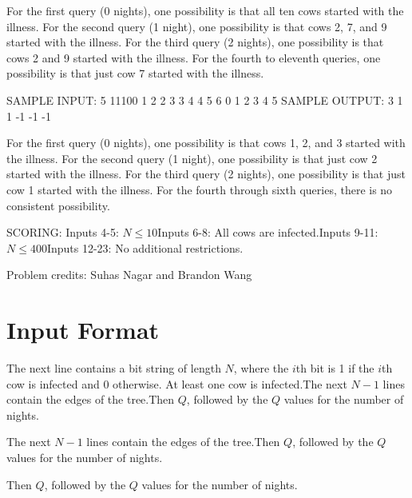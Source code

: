 \documentclass[12pt]{article}
\begin{document}
For the first query (0 nights), one possibility is that all ten cows started
with the illness. For the second query (1 night), one possibility is that cows
2, 7, and 9 started with the illness. For the third query (2 nights), one
possibility is that cows 2 and 9 started with the illness. For the fourth to
eleventh queries, one possibility is that just cow 7 started with the illness.

SAMPLE INPUT:
5
11100
1 2
2 3
3 4
4 5
6
0
1
2
3
4
5
SAMPLE OUTPUT: 
3
1
1
-1
-1
-1

For the first query (0 nights), one possibility is that cows 1, 2, and 3 started
with the illness. For the second query (1 night), one possibility is that just
cow 2 started with the illness. For the third query (2 nights), one possibility
is that just cow 1 started with the illness. For the fourth through sixth
queries, there is no consistent possibility.

SCORING:
Inputs 4-5: $N \le 10$Inputs 6-8: All cows are infected.Inputs 9-11: $N \le 400$Inputs 12-23: No additional restrictions.


Problem credits: Suhas Nagar and Brandon Wang



\section*{Input Format}
The next line contains a bit string of length $N$, where the $i$th bit is 1  if
the $i$th cow is infected and 0 otherwise. At least one cow is infected.The next $N-1$ lines contain the edges of the tree.Then $Q$, followed by the $Q$ values for the number of nights.

The next $N-1$ lines contain the edges of the tree.Then $Q$, followed by the $Q$ values for the number of nights.

Then $Q$, followed by the $Q$ values for the number of nights.
\end{document}
